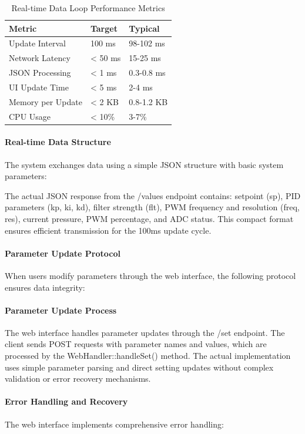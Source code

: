 \documentclass[12pt,a4paper]{article}
\begin{document}
\begin{table}[H]
\centering
\begin{tabular}{@{}lll@{}}
\toprule
\textbf{Metric} & \textbf{Target} & \textbf{Typical} \\
\midrule
Update Interval & 100 ms & 98-102 ms \\
Network Latency & < 50 ms & 15-25 ms \\
JSON Processing & < 1 ms & 0.3-0.8 ms \\
UI Update Time & < 5 ms & 2-4 ms \\
Memory per Update & < 2 KB & 0.8-1.2 KB \\
CPU Usage & < 10\% & 3-7\% \\
\bottomrule
\end{tabular}
\caption{Real-time Data Loop Performance Metrics}
\end{table}

\paragraph{Real-time Data Structure}
The system exchanges data using a simple JSON structure with basic system parameters:

The actual JSON response from the /values endpoint contains: setpoint (sp), PID parameters (kp, ki, kd), filter strength (flt), PWM frequency and resolution (freq, res), current pressure, PWM percentage, and ADC status. This compact format ensures efficient transmission for the 100ms update cycle.

\paragraph{Parameter Update Protocol}
When users modify parameters through the web interface, the following protocol ensures data integrity:

\paragraph{Parameter Update Process}
The web interface handles parameter updates through the /set endpoint. The client sends POST requests with parameter names and values, which are processed by the WebHandler::handleSet() method. The actual implementation uses simple parameter parsing and direct setting updates without complex validation or error recovery mechanisms.

\paragraph{Error Handling and Recovery}
The web interface implements comprehensive error handling:
\end{document}
